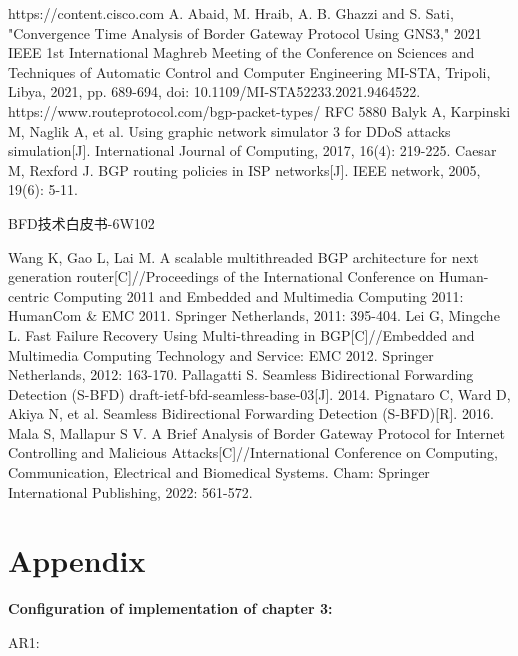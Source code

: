\documentclass[12pt]{article}
\begin{document}
\newpage
\begin{thebibliography}{99}
     https://content.cisco.com
     A. Abaid, M. Hraib, A. B. Ghazzi and S. Sati, "Convergence Time Analysis of Border Gateway Protocol Using GNS3," 2021 IEEE 1st International Maghreb Meeting of the Conference on Sciences and Techniques of Automatic Control and Computer Engineering MI-STA, Tripoli, Libya, 2021, pp. 689-694, doi: 10.1109/MI-STA52233.2021.9464522.
     https://www.routeprotocol.com/bgp-packet-types/
     RFC 5880
     Balyk A, Karpinski M, Naglik A, et al. Using graphic network simulator 3 for DDoS attacks simulation[J]. International Journal of Computing, 2017, 16(4): 219-225.
     Caesar M, Rexford J. BGP routing policies in ISP networks[J]. IEEE network, 2005, 19(6): 5-11.
     \begin{CJK}{UTF8}{gbsn} BFD技术白皮书-6W102 \end{CJK}
     Wang K, Gao L, Lai M. A scalable multithreaded BGP architecture for next generation router[C]//Proceedings of the International Conference on Human-centric Computing 2011 and Embedded and Multimedia Computing 2011: HumanCom \& EMC 2011. Springer Netherlands, 2011: 395-404.
     Lei G, Mingche L. Fast Failure Recovery Using Multi-threading in BGP[C]//Embedded and Multimedia Computing Technology and Service: EMC 2012. Springer Netherlands, 2012: 163-170.
     Pallagatti S. Seamless Bidirectional Forwarding Detection (S-BFD) draft-ietf-bfd-seamless-base-03[J]. 2014.
     Pignataro C, Ward D, Akiya N, et al. Seamless Bidirectional Forwarding Detection (S-BFD)[R]. 2016.
     Mala S, Mallapur S V. A Brief Analysis of Border Gateway Protocol for Internet Controlling and Malicious Attacks[C]//International Conference on Computing, Communication, Electrical and Biomedical Systems. Cham: Springer International Publishing, 2022: 561-572.
\end{thebibliography}

\newpage

\appendix
\section*{Appendix}
\textbf{Configuration of implementation of chapter 3:}

\noindent AR1:
\end{document}
